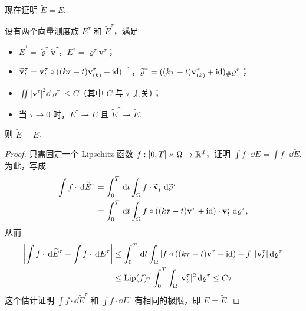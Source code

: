 现在证明 $\widetilde E=E$.
\begin{lemma}\label{obj:8.9}
设有两个向量测度族 $E^\tau$ 和 $\widetilde E^\tau$，满足
\begin{itemize}
\item $\widetilde E^\tau=\widetilde\varrho^\tau\widetilde{\mathbf v}^\tau$，$E^\tau=\varrho^\tau\mathbf v^\tau$；
\item $\widetilde{\mathbf v}_t^\tau=\mathbf v_t^\tau\circ((k\tau-t)\mathbf v_{(k)}^\tau+\operatorname{id})^{-1}$，$\widetilde\varrho^\tau=((k\tau-t)\mathbf v_{(k)}^\tau+\operatorname{id})_\#\varrho^\tau$；
\item $\iint|\mathbf v^\tau|^2\dd\varrho^\tau\leq C$（其中 $C$ 与 $\tau$ 无关）；
\item 当 $\tau\to0$ 时，$E^\tau\rightharpoonup E$ 且 $\widetilde E^\tau\rightharpoonup\widetilde E$.
\end{itemize}
则 $\widetilde E=E$.
\end{lemma}
\begin{proof}
只需固定一个 Lipschitz 函数 $f:[0,T]\times\Omega\to\mathbb R^d$，证明 $\int f\cdot\dd E=\int f\cdot\dd\widetilde E$. 为此，写成
\[
\begin{aligned}
\int f\cdot\,\mathrm d\widetilde E^\tau
&=\int_0^T\,\mathrm d t\int_\Omega f\cdot\widetilde{\mathbf v}_t^\tau\,\mathrm d\widetilde\varrho^\tau\\
&=\int_0^T\,\mathrm d t\int_\Omega f\circ((k\tau-t)\mathbf v^\tau+\operatorname{id})\cdot\mathbf v_t^\tau\,\mathrm d\varrho^\tau,
\end{aligned}
\]
从而
\[
\begin{aligned}
\left|\int f\cdot\,\mathrm d\widetilde E^\tau-\int f\cdot\,\mathrm d E^\tau\right|
&\leq\int_0^T\,\mathrm d t\int_\Omega
|f\circ((k\tau-t)\mathbf v^\tau+\operatorname{id})-f|\,|\mathbf v_t^\tau|\,\mathrm d\varrho^\tau\\
&\leq\operatorname{Lip}(f)\tau\int_0^T\int_\Omega|\mathbf v_t^\tau|^2\,\mathrm d\varrho^\tau\leq C\tau.
\end{aligned}
\]
这个估计证明 $\int f\cdot\dd\widetilde E^\tau$ 和 $\int f\cdot\dd E^\tau$ 有相同的极限，即 $E=\widetilde E$.
\end{proof}

